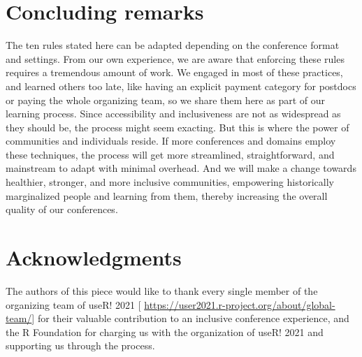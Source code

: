 \documentclass[10pt,letterpaper]{article}
\begin{document}
\section*{Concluding remarks}

The ten rules stated here can be adapted depending on the conference format and settings. From our own experience, we are aware that enforcing these rules requires a tremendous amount of work. We engaged in most of these practices, and learned others too late, like having an explicit payment category for postdocs or paying the whole organizing team, so we share them here as part of our learning process. 
Since accessibility and inclusiveness are not as widespread as they should be, the process might seem exacting. But this is where the power of communities and individuals reside. If more conferences and domains employ these techniques, the process will get more streamlined, straightforward, and mainstream to adapt with minimal overhead. And we will make a change towards healthier, stronger, and more inclusive communities, empowering historically marginalized people and learning from them, thereby increasing the overall quality of our conferences.%



\section*{Acknowledgments}
The authors of this piece would like to thank every single member of the organizing team of useR! 2021 [ \url{https://user2021.r-project.org/about/global-team/}] for their valuable contribution to an inclusive conference experience, and the R Foundation for charging us with the organization of useR! 2021 and supporting us through the process. 








\end{document}
